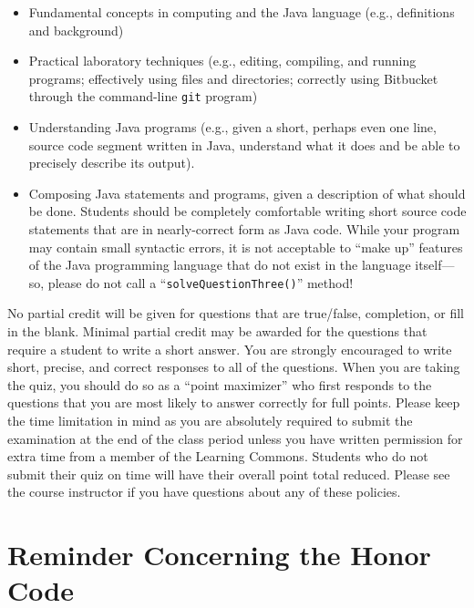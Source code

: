 \vspace*{-.05in}
\begin{itemize}

  \itemsep 0in

\item Fundamental concepts in computing and the Java language (e.g., definitions and background)

\item Practical laboratory techniques (e.g., editing, compiling, and running programs; effectively using files and
  directories; correctly using Bitbucket through the command-line {\tt git} program)

\item Understanding Java programs (e.g., given a short, perhaps even one line, source code segment written in Java,
  understand what it does and be able to precisely describe its output).

\item Composing Java statements and programs, given a description of what should be done. Students should be completely
  comfortable writing short source code statements that are in nearly-correct form as Java code. While your program may
  contain small syntactic errors, it is not acceptable to ``make up'' features of the Java programming language that do
  not exist in the language itself---so, please do not call a ``{\tt solveQuestionThree()}'' method!

\end{itemize}

\noindent No partial credit will be given for questions that are true/false, completion, or fill in the blank. Minimal
partial credit may be awarded for the questions that require a student to write a short answer. You are strongly
encouraged to write short, precise, and correct responses to all of the questions. When you are taking the quiz, you
should do so as a ``point maximizer'' who first responds to the questions that you are most likely to answer correctly for
full points. Please keep the time limitation in mind as you are absolutely required to submit the examination at the end
of the class period unless you have written permission for extra time from a member of the Learning Commons. Students
who do not submit their quiz on time will have their overall point total reduced. Please see the course instructor if
you have questions about any of these policies.

\vspace*{-.2in}
\section*{Reminder Concerning the Honor Code}

